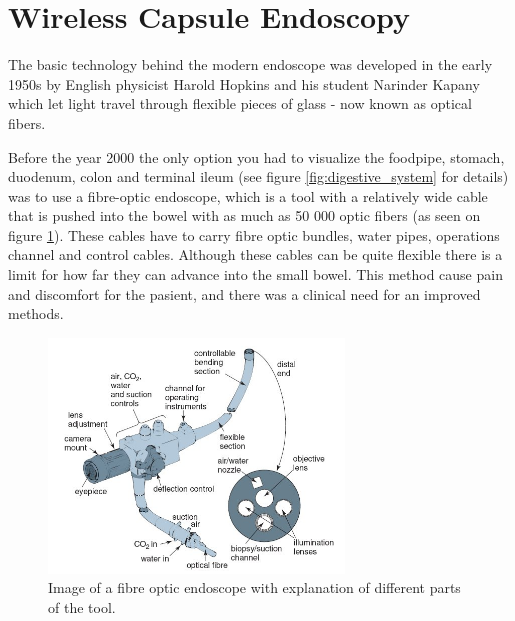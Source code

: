 \documentclass[english, a4paper]{report}
\begin{document}
\section{Wireless Capsule Endoscopy}
The basic technology behind the modern endoscope was developed in the early 1950s by English physicist Harold Hopkins and his student Narinder Kapany which let light travel through flexible pieces of glass - now known as optical fibers. \cite{NewMethod54}

Before the year 2000 the only option you had to visualize the foodpipe, stomach, duodenum, colon and terminal ileum (see figure \ref{fig:digestive_system} for details) was to use a fibre-optic endoscope, which is a tool with a relatively wide cable that is pushed into the bowel with as much as 50 000 optic fibers (as seen on figure \ref{fig:fibre-optic-endoscopy}). These cables have to carry fibre optic bundles, water pipes, operations channel and control cables. Although these cables can be quite flexible there is a limit for how far they can advance into the small bowel. This method cause pain and discomfort for the pasient, and there was a clinical need for an improved methods.

\begin{figure} %
  \begin{center}
    \includegraphics[width=0.7\textwidth]{fibre-optic-endoscope.jpg}
    \caption{Image of a fibre optic endoscope with explanation of different parts of the tool. \cite{MedicalPhysics}}
    \label{fig:fibre-optic-endoscopy}
  \end{center}
\end{figure}
\end{document}
